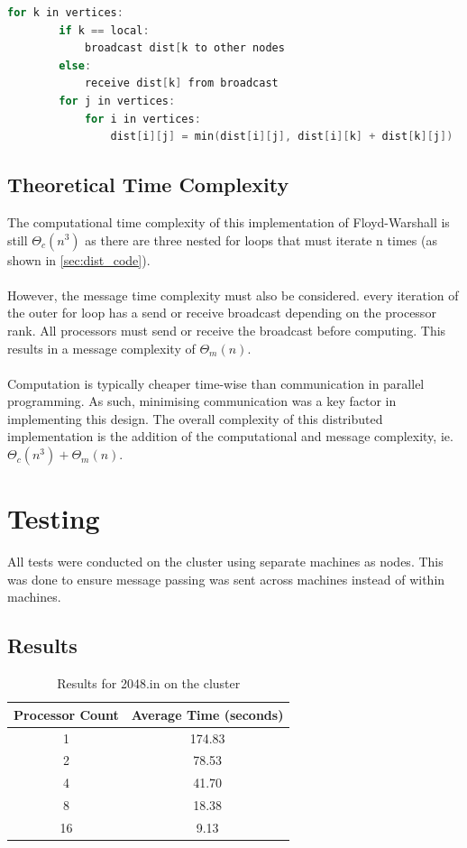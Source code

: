 \documentclass[12pt]{article}
\begin{document}
\begin{lstlisting}[language=c, caption=Distributed example]
    for k in vertices:
        if k == local:
            broadcast dist[k to other nodes
        else:
            receive dist[k] from broadcast
        for j in vertices:
            for i in vertices:
                dist[i][j] = min(dist[i][j], dist[i][k] + dist[k][j])
\end{lstlisting}

\subsection{Theoretical Time Complexity}
The computational time complexity of this implementation of Floyd-Warshall is still \(\Theta_c(n^3)\) as there are three nested for loops that must iterate n times (as shown in \ref{sec:dist_code}). 
\\\\
However, the message time complexity must also be considered. every iteration of the outer for loop has a send or receive broadcast depending on the processor rank. All processors must send or receive the broadcast before computing. This results in a message complexity of \(\Theta_m(n)\).
\\\\
Computation is typically cheaper time-wise than communication in parallel programming. As such, minimising communication was a key factor in implementing this design. The overall complexity of this distributed implementation is the addition of the computational and message complexity, ie.\(\Theta_c(n^3) + \Theta_m(n)\).


\section{Testing}
All tests were conducted on the cluster using separate machines as nodes. This was done to ensure message passing was sent across machines instead of within machines.

\subsection{Results}

\begin{table}[H]
\centering
 \begin{tabular}{|c|c|}
 \hline
 Processor Count & Average Time (seconds)\\
 \hline
 1 &  174.83\\ 
 \hline
 2 & 78.53 \\ 
 \hline
 4 & 41.70 \\
 \hline
 8 & 18.38 \\
 \hline
 16 & 9.13 \\
 \hline
\end{tabular}
\caption{Results for 2048.in on the cluster}
\end{table}
\end{document}
